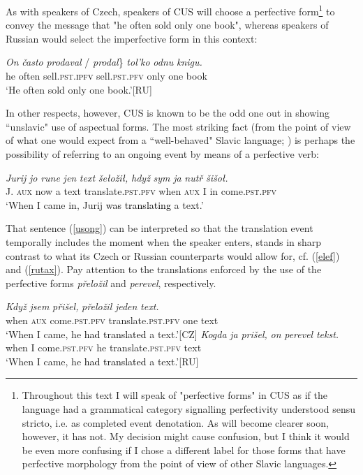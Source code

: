 \documentclass[output=paper,colorlinks,citecolor=brown]{langscibook}
\begin{document}
\noindent As with speakers of Czech, speakers of CUS will choose a perfective form\footnote{Throughout this text I will speak of "perfective forms" in CUS as if the language had a grammatical category signalling perfectivity understood sensu stricto, i.e. as completed event denotation. As will become clearer soon, however, it has not. My decision might cause confusion, but I think it would be even more confusing if I chose a different label for those forms that have perfective morphology from the point of view of other Slavic languages.} to convey the message that "he often sold only one book", whereas speakers of Russian would select the imperfective form in this context: 

 \ea\label{ele}
\gll \textit{On}
\textit{\v{c}asto} \minsp{\{} \textit{prodaval} / \minsp{*} \textit{prodal}\} 
\textit{tol'ko} \textit{odnu} \textit{knigu.} \\
he often {} sell.\textsc{pst.\textcolor{black}{ipfv}} {} {} sell.\textsc{pst.pfv} only one book \\
\glt \normalsize{`He often sold only one book.'}\hfill \small{[RU]}
\z 

\noindent In other respects, however, CUS is known to be the odd one out in showing ``unslavic" use of aspectual forms. The most striking fact (from the point of view of what one would expect from a ``well-behaved" Slavic language; \citealt[54]{Breu2000}) is perhaps the possibility of referring to an ongoing event by means of a perfective verb:

 \ea\label{usong}
\gll \textit{Jurij} \textit{jo} \textit{rune} \textit{jen} \textit{text} 
\textit{še\l{o}ži\l,} \textit{hdyž} \textit{sym} \textit{ja}
\textit{nutř}
\textit{šišo\l.}\\
J. \textsc{aux} now a text translate.\textsc{pst.pfv} when \textsc{aux} I in come.\textsc{pst.pfv}\\
\glt \normalsize{`When I came in, Jurij \textcolor{black}{was translating} a text.'}
\z


\noindent That sentence (\ref{usong}) can be interpreted so that the translation event temporally includes the moment when the speaker enters, stands in sharp contrast to what its Czech or Russian counterparts would allow for, cf. (\ref{elef}) and (\ref{rutax}). Pay attention to 
the translations enforced by the use of the perfective forms \textit{přeložil} and \textit{perevel}, respectively.

 \ea\label{elef}
\gll \textit{Když}
\textit{jsem} \textit{přišel,}
\textit{přeložil}
\textit{jeden} \textit{text.} \\
when \textsc{aux} come.\textsc{pst.pfv} translate.\textsc{pst.pfv} one text \\
\glt \normalsize{`When I came, he \textcolor{black}{had translated} a text.'}\hfill \small{[CZ]}
\z 
 \ea\label{rutax}
\gll \textit{Kogda}
\textit{ja} \textit{prišel,}
\textit{on} \textit{perevel} \textit{tekst.} \\
when I come.\textsc{pst.pfv} he translate.\textsc{pst.pfv} text \\
\glt \normalsize{`When I came, he \textcolor{black}{had translated} a text.'}\hfill \small{[RU]}
\z 
\end{document}
